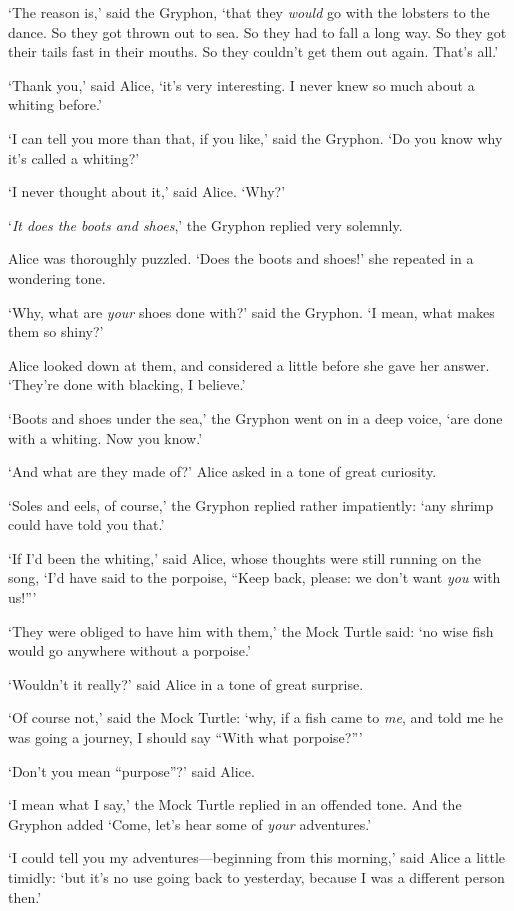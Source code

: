 \documentclass[12pt,openany]{memoir}
\begin{document}
`The reason is,' said the Gryphon, `that they \textit{would} go with the lobsters to the dance. So they got thrown out to sea. So they had to fall a long way. So they got their tails fast in their mouths. So they couldn't get them out again. That's all.'

`Thank you,' said Alice, `it's very interesting. I never knew so much about a whiting before.'

`I can tell you more than that, if you like,' said the Gryphon. `Do you know why it's called a whiting?'

`I never thought about it,' said Alice. `Why?'

`\textit{It does the boots and shoes},' the Gryphon replied very solemnly.

Alice was thoroughly puzzled. `Does the boots and shoes!' she repeated in a wondering tone.

`Why, what are \textit{your} shoes done with?' said the Gryphon. `I mean, what makes them so shiny?'

Alice looked down at them, and considered a little before she gave her answer. `They're done with blacking, I believe.'

`Boots and shoes under the sea,' the Gryphon went on in a deep voice, `are done with a whiting. Now you know.'

`And what are they made of?' Alice asked in a tone of great curiosity.

`Soles and eels, of course,' the Gryphon replied rather impatiently: `any shrimp could have told you that.'

`If I'd been the whiting,' said Alice, whose thoughts were still running on the song, `I'd have said to the porpoise, ``Keep back, please: we don't want \textit{you} with us!'''

`They were obliged to have him with them,' the Mock Turtle said: `no wise fish would go anywhere without a porpoise.'

`Wouldn't it really?' said Alice in a tone of great surprise.

`Of course not,' said the Mock Turtle: `why, if a fish came to \textit{me}, and told me he was going a journey, I should say ``With what porpoise?'''

`Don't you mean ``purpose''?' said Alice.

`I mean what I say,' the Mock Turtle replied in an offended tone. And the Gryphon added `Come, let's hear some of \textit{your} adventures.'

`I could tell you my adventures---beginning from this morning,' said Alice a little timidly: `but it's no use going back to yesterday, because I was a different person then.'
\end{document}
